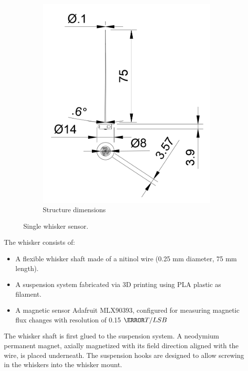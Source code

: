 \begin{figure}[ht]
\begin{subfigure}{0.31\textwidth}
        \includegraphics[width=\linewidth]{figures/whisker-dims}
        \caption{Structure dimensions} \label{fig:whisker-dims}
    \end{subfigure}
    \caption{Single whisker sensor.}
    \label{fig:whisker_composite}
\end{figure}

The whisker consists of:
\begin{itemize}
    \item A flexible whisker shaft made of a nitinol wire (0.25 mm diameter, 75 mm length).
    \item A suspension system fabricated via 3D printing using PLA plastic as filament.
    \item A magnetic sensor Adafruit MLX90393, configured for measuring magnetic flux changes with resolution of 0.15 $\micro T/LSB$
\end{itemize}
The whisker shaft is first glued to the suspension system.
A neodymium permanent magnet, axially magnetized with its field direction aligned with the wire, is placed underneath.
The suspension hooks are designed to allow screwing in the whiskers into the whisker mount.

